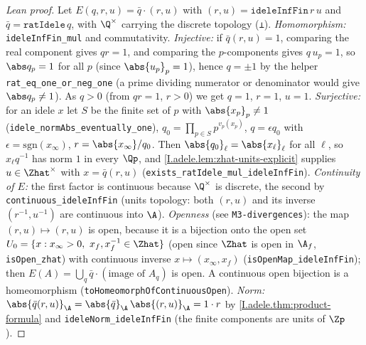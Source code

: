\begin{proof}[Lean proof]
Let $E(q,r,u)=\bar q\cdot(r,u)$ with $(r,u)=\mathtt{ideleInfFin}\,r\,u$ and $\bar q=\mathtt{ratIdele}\,q$, with $\Q^\times$ carrying the discrete topology (\texttt{⊥}). \emph{Homomorphism:} \texttt{ideleInfFin\_mul} and commutativity. \emph{Injective:} if $\bar q(r,u)=1$, comparing the real component gives $qr=1$, and comparing the $p$-components gives $q\,u_p=1$, so $\abs q_p=1$ for all $p$ (since $\abs{u_p}_p=1$), hence $q=\pm1$ by the helper \texttt{rat\_eq\_one\_or\_neg\_one} (a prime dividing numerator or denominator would give $\abs q_p\ne1$). As $q>0$ (from $qr=1$, $r>0$) we get $q=1$, $r=1$, $u=1$. \emph{Surjective:} for an idele $x$ let $S$ be the finite set of $p$ with $\abs{x_p}_p\ne1$ (\texttt{idele\_normAbs\_eventually\_one}), $q_0=\prod_{p\in S}p^{v_p(x_p)}$, $q=\epsilon q_0$ with $\epsilon=\mathrm{sgn}(x_\infty)$, $r=\abs{x_\infty}/q_0$. Then $\abs{q_0}_\ell=\abs{x_\ell}_\ell$ for all $\ell$, so $x_\ell q^{-1}$ has norm $1$ in every $\Qp$, and \cref{I.adele.lem:zhat-units-explicit} supplies $u\in\Zhat^\times$ with $x=\bar q(r,u)$ (\texttt{exists\_ratIdele\_mul\_ideleInfFin}). \emph{Continuity of $E$:} the first factor is continuous because $\Q^\times$ is discrete, the second by \texttt{continuous\_ideleInfFin} (units topology: both $(r,u)$ and its inverse $(r^{-1},u^{-1})$ are continuous into $\A$). \emph{Openness} (see \texttt{M3-divergences}): the map $(r,u)\mapsto(r,u)$ is open, because it is a bijection onto the open set $U_0=\{x: x_\infty>0,\ x_f,x_f^{-1}\in\Zhat\}$ (open since $\Zhat$ is open in $\A_f$, \texttt{isOpen\_zhat}) with continuous inverse $x\mapsto(x_\infty,x_f)$ (\texttt{isOpenMap\_ideleInfFin}); then $E(A)=\bigcup_q\bar q\cdot(\text{image of }A_q)$ is open. A continuous open bijection is a homeomorphism (\texttt{toHomeomorphOfContinuousOpen}). \emph{Norm:} $\abs{\bar q(r,u)}_\A=\abs{\bar q}_\A\,\abs{(r,u)}_\A=1\cdot r$ by \cref{I.adele.thm:product-formula} and \texttt{ideleNorm\_ideleInfFin} (the finite components are units of $\Zp$).
\end{proof}

